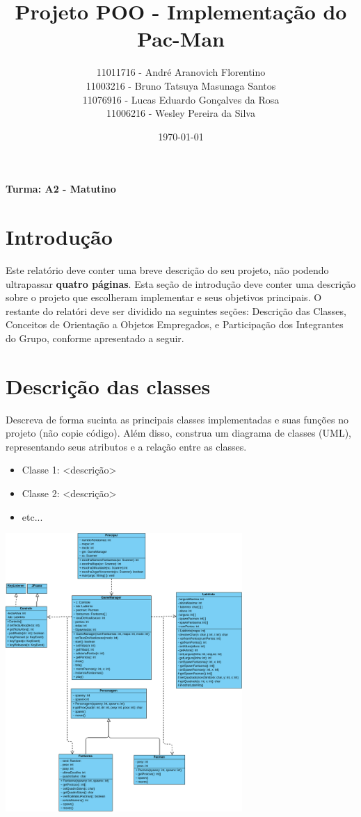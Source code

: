\documentclass[]{article}
\title{Projeto POO - Implementação do Pac-Man}
\author{11011716 - André Aranovich Florentino\\ 11003216 - Bruno Tatsuya Masunaga Santos\\ 11076916 - Lucas Eduardo Gonçalves da Rosa\\ 11006216 - Wesley Pereira da Silva}
\date{\today}
\begin{document}
\maketitle

\centerline{\textbf{Turma: A2 - Matutino}}

\section{Introdução}
Este relatório deve conter uma breve descrição do seu projeto, não podendo ultrapassar \textbf{quatro páginas}. Esta seção de introdução deve conter uma descrição sobre o projeto que escolheram implementar e seus objetivos principais. O restante do relatóri deve ser dividido na seguintes seções: Descrição das Classes, Conceitos de Orientação a Objetos Empregados, e Participação dos Integrantes do Grupo, conforme apresentado a seguir. 

\section{Descrição das classes}
Descreva de forma sucinta as principais classes implementadas e suas funções no projeto (não copie código). Além disso, construa um diagrama de classes (UML), representando seus atributos e a relação entre as classes.

\begin{itemize}
	\item Classe 1: <descrição>
	\item Classe 2: <descrição>
	\item etc...
\end{itemize}

\begin{center}
\includegraphics[width=9cm]{UML.PNG}
\end{center}
\end{document}
